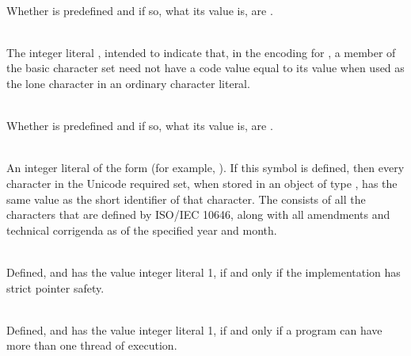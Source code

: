\begin{description}
%
\item {}\\
Whether  is predefined and if so, what its value is,
are .

%
\item {}\\
The integer literal , intended to indicate that, in the encoding for
, a member of the basic character set need not have a code value equal to
its value when used as the lone character in an ordinary character literal.

%
\item {}\\
Whether  is predefined and if so, what its value is,
are .

%
\item {}\\
An integer literal of the form  (for example,
).
If this symbol is defined, then every character in the Unicode required set, when
stored in an object of type , has the same value as the short identifier
of that character. The  consists of all
the characters that are defined by ISO/IEC 10646, along with
all amendments and technical corrigenda as of the specified year and month.

%
\item {}\\
Defined, and has the value integer literal 1, if and only if the implementation
has strict pointer safety.

%
\item {}\\
Defined, and has the value integer literal 1, if and only if a program
can have more than one thread of execution.

\end{description}

